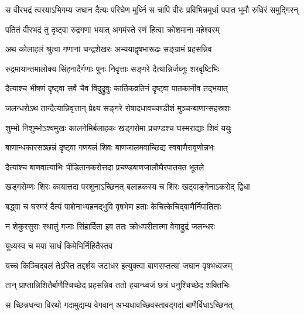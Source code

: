 \fourlineindentedshloka
{स वीरभद्रं त्वरयाऽभिगम्य}
{जघान दैत्यः परिघेण मूर्ध्नि}
{स चापि वीरः प्रविभिन्नमूर्धा}
{पपात भूमौ रुधिरं समुद्गिरन्} %





\twolineshloka
{पतितं वीरभद्रं तु दृष्ट्वा रुद्रगणा भयात्}
{अगमंस्ते रणं हित्वा क्रोशमाना महेश्वरम्} %

\twolineshloka
{अथ कोलाहलं श्रुत्वा गणानां चन्द्रशेखरः}
{अभ्ययाद्वृषभारूढः सङ्ग्रामं प्रहसन्निव} %

\twolineshloka
{रुद्रमायान्तमालोक्य सिंहनादैर्गणाः पुनः}
{निवृत्ताः सङ्गरे दैत्यान्निर्जघ्नुः शरवृष्टिभिः} %

\twolineshloka
{दैत्याश्च भीषणं दृष्ट्वा सर्वे चैव विदुद्रुवुः}
{कार्तिकव्रतिनं दृष्ट्वा पातकानीव तद्भयात्} %

\twolineshloka
{जलन्धरोऽथ तान्दैत्यान्निवृत्तान् प्रेक्ष्य सङ्गरे}
{रोषादधावच्चण्डीशं मुञ्चन्बाणान्सहस्रशः} %

\twolineshloka
{शुम्भो निशुम्भोऽश्वमुखः कालनेमिर्बलाहकः}
{खड्गरोमा प्रचण्डश्च घस्मराद्याः शिवं ययुः} %

\twolineshloka
{बाणान्धकारसञ्छन्नं दृष्ट्वा गणबलं शिवः}
{बाणजालमवाच्छिद्य स्वबाणैरावृणोन्नभः} %

\twolineshloka
{दैत्यांश्च बाणवात्याभिः पीडितानकरोत्तदा}
{प्रचण्डबाणजालौघैरपातयत भूतले} %

\twolineshloka
{खड्गरोम्णः शिरः कायात्तदा परशुनाऽच्छिनत्}
{बलाहकस्य च शिरः खट्वाङ्गेनाऽकरोद् द्विधा} %

\twolineshloka
{बद्ध्वा च घस्मरं दैत्यं पाशेनाभ्यहनद्भुवि}
{वृषभेण हताः केचित्केचिद्बाणैर्निपातिताः} %

\twolineshloka
{न शेकुरसुराः स्थातुं गजाः सिंहार्दिता इव}
{ततः क्रोधपरीतात्मा वेगाद्रुद्रं जलन्धरः} %




\onelineshloka
{युध्यस्व च मया सार्धं किमेभिर्निहितैस्तव} %

\twolineshloka
{यच्च किञ्चिद्बलं तेऽस्ति तद्दर्शय जटाधर}
{इत्युक्त्वा बाणसप्तत्या जघान वृषभध्वजम्} %

\twolineshloka
{तान् प्राप्तान्निशितैर्बाणैश्चिच्छेद प्रहसन्निव}
{ततो हयान्ध्वजं छत्रं धनुश्चिच्छेद शक्तिभिः} %

\twolineshloka
{स च्छिन्नधन्वा विरथो गदामुद्यम्य वेगवान्}
{अभ्यधावच्छिवस्तावद्गदां बाणैर्विधाऽच्छिनत्} %

